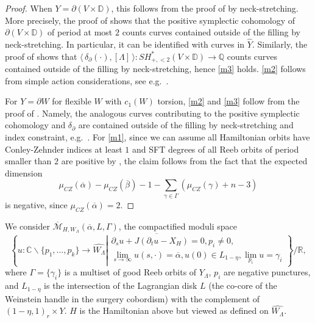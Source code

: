 \documentclass[reqno,11pt]{amsart}
\numberwithin{equation}{section}
\def\R{\mathbb{R}}
\def\C{{\mathbb C}}
\def\D{{\mathbb D}}
\def\Q{{\mathbb Q}}
\def\cM{{\mathcal M}}
\def\la{\langle\,}
\def\ra{\,\rangle}
\begin{document}
\begin{proof}
When $Y=\partial(V\times \D)$, this follows from the proof of \cite[Propositions 2.7, 3.2]{zbMATH07673358} by neck-stretching. More precisely, the proof of \cite[Proposition 2.7]{zbMATH07673358} shows that the positive symplectic cohomology of $\partial(V\times \D)$ of period at most $2$ counts curves contained outside of the filling by neck-stretching. In particular, it can be identified with curves in $\widehat{Y}$. Similarly, the proof of \cite[Proposition 3.2]{zbMATH07673358} shows that $\la\delta_{\partial}(\cdot),[\Lambda]\ra:SH^{*}_{+,<2}(V\times \D)\to \Q$ counts curves contained outside of the filling by neck-stretching, hence \eqref{m3} holds. \eqref{m2} follows from simple action considerations, see e.g.\ \cite[(3) of \S 4.3]{bowden2022making}.

For $Y=\partial W$ for flexible $W$ with $c_1(W)$ torsion, \eqref{m2} and \eqref{m3} follow from the proof of \cite[Theorem A]{zbMATH07367119}. Namely, the analogous curves contributing to the positive symplectic cohomology and $\delta_{\partial}$ are contained outside of the filling by neck-stretching and index constraint, e.g.\ \cite[(4) of \S 4.3]{bowden2022making}. For \eqref{m1}, since we can assume all Hamiltonian orbits have Conley-Zehnder indices at least $1$ and SFT degrees of all Reeb orbits of period smaller than $2$ are positive by \cite{zbMATH07184228}, the claim follows from the fact that the expected dimension 
$$\mu_{CZ}(\overline{\alpha})-\mu_{CZ}(\overline{\beta})-1-\sum_{\gamma\in \Gamma}(\mu_{CZ}(\gamma)+n-3)$$
is negative, since $\mu_{CZ}(\overline{\alpha})=2$.
\end{proof}

We consider $\overline{\cM}_{H,W_{\Lambda}}(\overline{\alpha},L,\Gamma)$, the compactified moduli space 
\begin{equation}\label{eqn:WH}
    \overline{\left\{u:\C \backslash \{p_1,\ldots,p_k\} \to \widehat{W_{\Lambda}}\left|
    \begin{array}{c}
    \partial_s u+J(\partial_t u-X_{H})=0, p_i\ne 0,\\
     \displaystyle \lim_{s\to \infty} u(s,\cdot)=\overline{\alpha}, u(0)\in L_{1-\eta}, \lim_{p_i} u= \gamma_i \end{array}\right.\right\}/\R},
\end{equation}
where $\Gamma=\{\gamma_i\}$ is a multiset of good Reeb orbits of $Y_{\Lambda}$, $p_i$ are negative punctures, and $L_{1-\eta}$ is the intersection of the Lagrangian disk $L$ (the co-core of the Weinstein handle in the surgery cobordism) with the complement of $(1-\eta,1)_r\times Y$. $H$ is the Hamiltonian above but viewed as defined on $\widehat{W_{\Lambda}}$.
\end{document}
